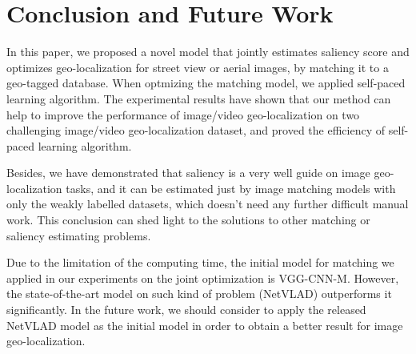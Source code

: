 \section{Conclusion and Future Work}
\par
In this paper, we proposed a novel model that jointly estimates saliency score and optimizes geo-localization for street view or aerial images, by matching it to a geo-tagged database. When optmizing the matching model, we applied self-paced learning algorithm. The experimental results have shown that our method can help to improve the performance of image/video geo-localization on two challenging image/video geo-localization dataset, and proved the efficiency of self-paced learning algorithm.
\par
Besides, we have demonstrated that saliency is a very well guide on image geo-localization tasks, and it can be estimated just by image matching models with only the weakly labelled datasets, which doesn't need any further difficult manual work. This conclusion can shed light to the solutions to other matching or saliency estimating problems. 
\par
Due to the limitation of the computing time, the initial model for matching we applied in our experiments on the joint optimization is VGG-CNN-M. However, the state-of-the-art model on such kind of problem (NetVLAD) outperforms it significantly. In the future work, we should consider to apply the released NetVLAD model as the initial model in order to obtain a better result for image geo-localization.
